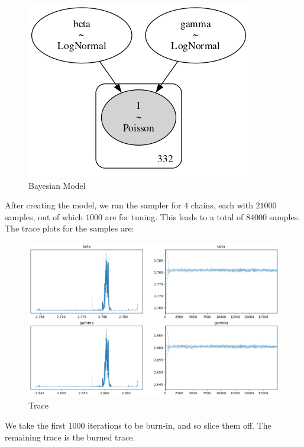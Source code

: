 \documentclass[letterpaper,12pt]{report}
\begin{document}
\begin{figure}[H]
    \centering
    \includegraphics[scale = 0.51]{model.png}
    \caption{Bayesian Model}
    \label{fig:my_label}
\end{figure}

\noindent
After creating the model, we ran the sampler for $4$ chains, each with $21000$ samples, out of which $1000$ are for tuning. This leads to a total of $84000$ samples. The trace plots for the samples are:

\begin{figure}[H]
    \centering
    \includegraphics[scale = 0.65]{trace.png}
    \caption{Trace}
\end{figure}

\noindent
We take the first 1000 iterations to be burn-in, and so slice them off. The remaining trace is the burned trace.
\end{document}
